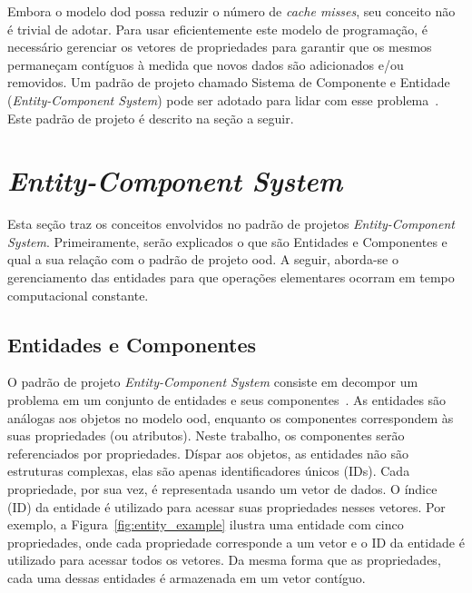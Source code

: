 Embora o modelo \ac{dod} possa reduzir o número de \textit{cache misses}, seu conceito não é trivial de adotar.
Para usar eficientemente este modelo de programação, é necessário gerenciar os vetores de propriedades para garantir que os mesmos permaneçam contíguos à medida que novos dados são adicionados e/ou removidos. Um padrão de projeto chamado Sistema de Componente e Entidade (\textit{Entity-Component System}) pode ser adotado para lidar com esse problema~\cite{nystrom2014game}. Este padrão de projeto é descrito na seção a seguir.

\section{\textit{Entity-Component System}}
\label{sec:entity_component_system}

Esta seção traz os conceitos envolvidos no padrão de projetos \textit{Entity-Component System}.
Primeiramente, serão explicados o que são Entidades e Componentes e qual a sua relação com o padrão de projeto \ac{ood}.
A seguir, aborda-se o gerenciamento das entidades para que operações elementares ocorram em tempo computacional constante.

\subsection{Entidades e Componentes}

O padrão de projeto \textit{Entity-Component System} consiste em decompor um problema em um conjunto de entidades e seus componentes~\cite{nystrom2014game}. As entidades são análogas aos objetos no modelo \ac{ood}, enquanto os componentes correspondem às suas propriedades (ou atributos). Neste trabalho, os componentes serão referenciados por propriedades. Díspar aos objetos, as entidades não são estruturas complexas, elas são apenas identificadores únicos (IDs). Cada propriedade, por sua vez, é representada usando um vetor de dados. O índice (ID) da entidade é utilizado para acessar suas propriedades nesses vetores. Por exemplo, a Figura~\ref{fig:entity_example} ilustra uma entidade com cinco propriedades, onde cada propriedade corresponde a um vetor e o ID da entidade é utilizado para acessar todos os vetores. Da mesma forma que as propriedades, cada uma dessas entidades é armazenada em um vetor contíguo.

